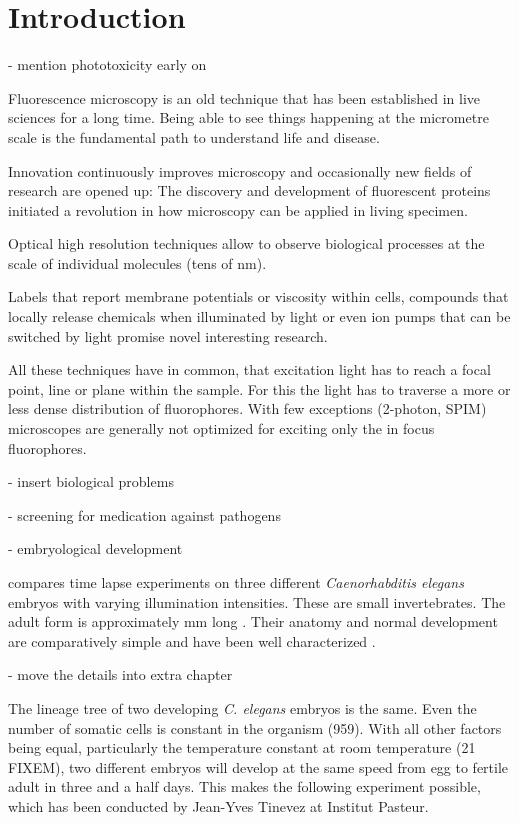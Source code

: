 \chapter{Introduction}
\label{sec:intro}

- mention phototoxicity early on

Fluorescence microscopy is an old technique that has been established    %
in live sciences for a long time. Being able to see things happening
at the micrometre scale is the fundamental path to understand life and
disease.

Innovation continuously improves microscopy and occasionally new        %
fields of research are opened up: The discovery and development of
fluorescent proteins initiated a revolution in how microscopy can be
applied in living specimen. 

Optical high resolution techniques allow to observe biological          %
processes at the scale of individual molecules (tens of nm).

Labels that report membrane potentials or viscosity within cells,       %
compounds that locally release chemicals when illuminated by light or
even ion pumps that can be switched by light promise novel interesting
research.

All these techniques have in common, that excitation light has to       %
reach a focal point, line or plane within the sample. For this the
light has to traverse a more or less dense distribution of
fluorophores.  With few exceptions (2-photon, SPIM) microscopes are
generally not optimized for exciting only the in focus fluorophores.

- insert biological problems

- screening for medication against pathogens

- embryological development

 compares time lapse experiments on three    %
different \emph{Caenorhabditis elegans} embryos with varying
illumination intensities. These are small invertebrates. The adult
form is approximately \unit[1]{mm} long . Their anatomy and normal
development are comparatively simple and have been well characterized
\citep{Durbin1987}.

- move the details into extra chapter

The lineage tree of two developing \emph{C. elegans} embryos is the     
same.  Even the number of somatic cells is constant in the organism
(959). With all other factors being equal, particularly the
temperature constant at room temperature (21 FIXEM), two different
embryos will develop at the same speed from egg to fertile adult in
three and a half days. This makes the following experiment possible,
which has been conducted by Jean-Yves Tinevez at Institut Pasteur.

